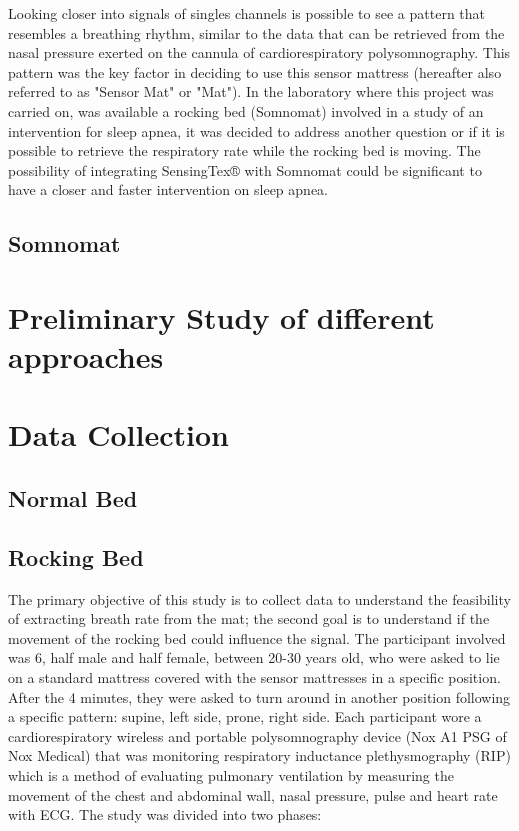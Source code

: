 Looking closer into signals of singles channels is possible to see a pattern that resembles a breathing rhythm,  similar to the data that can
 be retrieved from the nasal pressure exerted on the cannula of cardiorespiratory polysomnography.
This pattern was the key factor in deciding to use this sensor mattress (hereafter also referred to as "Sensor Mat" or "Mat"). 
In the laboratory where this project was carried on, was available a rocking bed (Somnomat) involved in a study of an intervention for 
sleep apnea, it was decided to address another question or if it is possible to retrieve the respiratory rate while the rocking bed is moving.
The possibility of integrating SensingTex® with Somnomat could be significant to have a closer and faster intervention on sleep apnea.
\subsection{Somnomat}
\section{Preliminary Study of different approaches} 
\section{Data Collection}
\subsection{Normal Bed}
\subsection{Rocking Bed}

The primary objective of this study is to collect data to understand the feasibility of extracting breath rate from the mat; the second goal is to understand if the movement of the rocking bed could influence the signal.
The participant involved was 6, half male and half female, between 20-30 years old, who were asked to lie on a standard mattress covered with the sensor mattresses in a specific position. 
After the 4 minutes, they were asked to turn around in another position following a specific pattern: supine, left side, prone, right side.
Each participant wore a cardiorespiratory wireless and portable polysomnography device (Nox A1 PSG of Nox Medical) that was
monitoring respiratory inductance plethysmography (RIP) which is a method of evaluating pulmonary ventilation by measuring the movement of the chest and abdominal wall, nasal pressure, pulse and heart rate with ECG. 
The study was divided into two phases:

